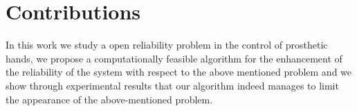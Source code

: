 \section{Contributions}
In this work we study a open reliability problem in the control of prosthetic hands, we propose a computationally feasible algorithm for the enhancement of the reliability of the system with respect to the above mentioned problem and we show through experimental results that our algorithm indeed manages to limit the appearance of the above-mentioned problem.